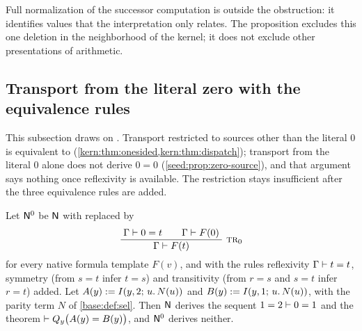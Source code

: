 Full normalization of the successor computation is outside the
obstruction: it identifies values that the interpretation only relates.
The proposition excludes this one deletion in the neighborhood of the
kernel; it does not exclude other presentations of arithmetic.

\subsection{Transport from the literal zero with the equivalence rules}
\label{disch:sec:zero-refl}

This subsection draws on . Transport restricted
to sources other than the literal $0$ is equivalent to 
(\cref{kern:thm:onesided,kern:thm:dispatch}); transport from the literal
$0$ alone does not derive $0=0$ (\cref{seed:prop:zero-source}), and that
argument says nothing once reflexivity is available. The restriction stays
insufficient after the three equivalence rules are added.

\begin{proposition}
\label{disch:prop:zero-refl}
Let $\mathsf{N}^{0}$ be $\mathsf{N}$ with  replaced by
\[
 \infrule{\Gamma\proves 0=t\qquad\Gamma\proves F(0)}{\Gamma\proves F(t)}\
 \rulename{Tr}_{0}
\]
for every native formula template $F(v)$, and with the rules reflexivity
$\Gamma\vdash t=t$, symmetry (from $s=t$ infer $t=s$) and transitivity
(from $r=s$ and $s=t$ infer $r=t$) added. Let $A(y)\mathrel{:=}I(y,2;\,u.\,N(u))$
and $B(y)\mathrel{:=}I(y,1;\,u.\,N(u))$, with the parity term $N$ of
\cref{base:def:sel}. Then $\mathsf{N}$ derives the sequent $1=2\vdash 0=1$
and the theorem $\vdash Q_{y}\bigl(A(y)=B(y)\bigr)$, and $\mathsf{N}^{0}$
derives neither.
\end{proposition}

